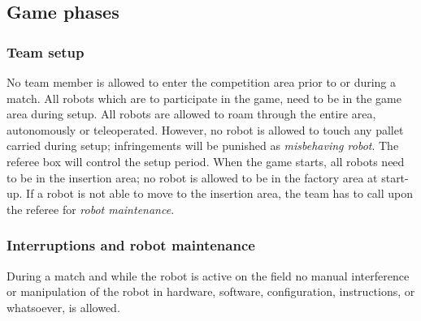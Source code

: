 \documentclass[12pt,twoside]{article}
\begin{document}
\subsection{Game phases}
\label{sec:game-phases}

\subsubsection{Team setup}
\label{sec:team-setup}
No team member is allowed to enter the competition area prior to or
during a match. All robots which are to participate in the game, need
to be in the game area during setup. All robots are allowed to roam
through the entire area, autonomously or teleoperated. However, no
robot is allowed to touch any pallet carried during setup;
infringements will be punished as \textit{misbehaving robot}. The
referee box will control the setup period. When the game starts, all
robots need to be in the insertion area; no robot is allowed to be in
the factory area at start-up. If a robot is not able to move to the
insertion area, the team has to call upon the referee for
\textit{robot maintenance}.



\subsubsection{Interruptions and robot maintenance}
\label{sec:robot-maintenance}
During a match and while the robot is active on the field no manual
interference or manipulation of the robot in hardware, software,
configuration, instructions, or whatsoever, is allowed.

\end{document}
